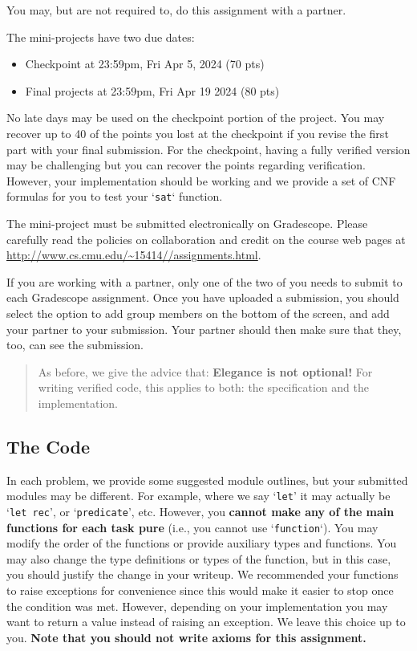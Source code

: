 \documentclass[11pt]{article}
\newcommand{\lecurl}{http://www.cs.cmu.edu/~15414/}
\begin{document}
\maketitle

You may, but are not required to, do this assignment with a partner.

The mini-projects have two due dates:
\begin{itemize}
\item Checkpoint at 23:59pm, Fri Apr 5, 2024 (70 pts)
\item Final projects at 23:59pm, Fri Apr 19 2024 (80 pts)
\end{itemize}

No late days may be used on the checkpoint portion of the project.  
You may recover up to 40 of the points you lost
at the checkpoint if you revise the first part with your final
submission. For the checkpoint, having a fully verified version may be 
challenging but you can recover the points regarding verification. 
However, your implementation should be working and we provide a set of 
CNF formulas for you to test your `\verb|sat|` function.

The mini-project must be submitted electronically on Gradescope.
Please carefully read the policies on collaboration and credit on the
course web pages at \url{\lecurl/assignments.html}.

If you are working with a partner, only one of the two of you needs to
submit to each Gradescope assignment.  Once you have uploaded a
submission, you should select the option to add group members on the
bottom of the screen, and add your partner to your submission.  Your
partner should then make sure that they, too, can see the submission.

\begin{quote}
  As before, we give the advice that: {\color{red}\textbf{Elegance is not
      optional!}}  For writing verified code, this applies to both:
  the specification and the implementation.
\end{quote}

\clearpage
\subsection*{The Code}

In each problem, we provide some suggested module outlines, but your
submitted modules may be different.  For example, where we say
`\verb|let|' it may actually be `\verb|let rec|', or
`\verb|predicate|', etc. However, you \textbf{cannot make any of the main 
functions for each task pure} (i.e., you cannot use `\verb|function|`). 
You may modify the order of the
functions or provide auxiliary types and functions.  You may also
change the type definitions or types of the function, but in this case,
you should justify the change in your writeup. 
%
We recommended your functions to raise exceptions for convenience since this would 
make it easier to stop once the condition was met. However, depending on your implementation 
you may want to return a value instead of raising an exception. We leave this choice up to you.
%
\textbf{Note that you should not write axioms for this assignment.}
\end{document}
